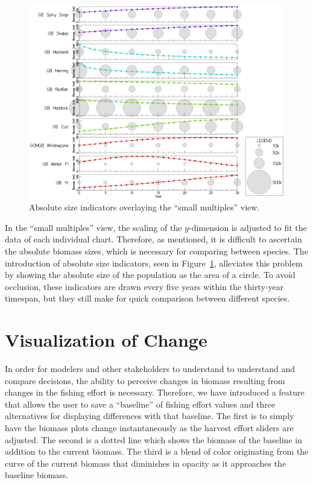 \begin{figure}[h]
	\centering
	\includegraphics[width=12cm]{figures/eps/msprod_abssize.eps}
	\caption{Absolute size indicators overlaying the ``small multiples'' view.}
	\label{fig:msprod_abssize}
\end{figure}

In the ``small multiples'' view, the scaling of the $y$-dimension is adjusted to fit the data of each individual chart.  Therefore, as mentioned, it is difficult to ascertain the absolute biomass sizes, which is necessary for comparing between species.  The introduction of absolute size indicators, seen in Figure~\ref{fig:msprod_abssize}, alleviates this problem by showing the absolute size of the population as the area of a circle.  To avoid occlusion, these indicators are drawn every five years within the thirty-year timespan, but they still make for quick comparison between different species.

\section{Visualization of Change}

In order for modelers and other stakeholders to understand to understand and compare decisions, the ability to perceive changes in biomass resulting from changes in the fishing effort is necessary.  Therefore, we have introduced a feature that allows the user to save a ``baseline'' of fishing effort values and three alternatives for displaying differences with that baseline.  The first is to simply have the biomass plots change instantaneously as the harvest effort sliders are adjusted.  The second is a dotted line which shows the biomass of the baseline in addition to the current biomass.  The third is a blend of color originating from the curve of the current biomass that diminishes in opacity as it approaches the baseline biomass.

